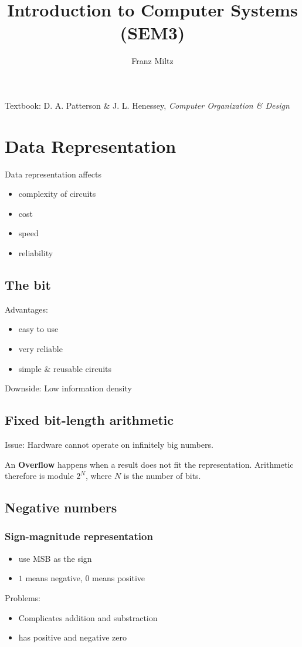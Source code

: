 \documentclass{article}
\begin{document}
\title{Introduction to Computer Systems (SEM3)}
\author{Franz Miltz}
\maketitle
\noindent Textbook: D. A. Patterson \& J. L. Henessey, \emph{Computer Organization \& Design}
\tableofcontents
\pagebreak
\section{Data Representation}
Data representation affects
\begin{itemize}
	\item complexity of circuits
	\item cost
	\item speed
	\item reliability
\end{itemize}
\subsection{The bit}
Advantages:
\begin{itemize}
	\item easy to use
	\item very reliable
	\item simple \& reusable circuits
\end{itemize}
Downside: Low information density
\subsection{Fixed bit-length arithmetic}
Issue: Hardware cannot operate on infinitely big numbers.
\begin{definition}
	An \textbf{Overflow} happens when a result does not fit the representation.
	Arithmetic therefore is module $2^N$, where $N$ is the number of bits.
\end{definition}
\subsection{Negative numbers}
\subsubsection{Sign-magnitude representation}
\begin{itemize}
	\item use MSB as the sign
	\item $1$ means negative, $0$ means positive
\end{itemize}
Problems: \begin{itemize}
	\item Complicates addition and substraction
	\item has positive and negative zero
\end{itemize}
\end{document}
